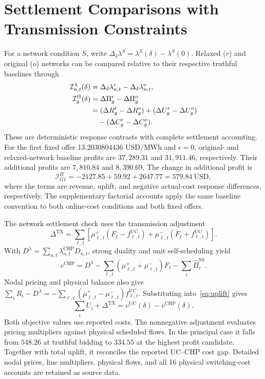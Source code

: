 \documentclass[journal]{IEEEtran}
\newcommand{\UC}{\mathrm{UC}}
\newcommand{\SSched}{\mathrm{SS}}
\newcommand{\CHP}{\mathrm{CHP}}
\begin{document}
\section{Settlement Comparisons with Transmission Constraints}\label{app:network-settlement}
For a network condition $S$, write $\Delta_\delta\lambda^S=\lambda^S(\delta)-\lambda^S(0)$. Relaxed ($r$) and original ($o$) networks can be compared relative to their respective truthful baselines through
\begin{align}
 \mathcal I_{n,t}^{\lambda}(\delta)&=\Delta_\delta\lambda_{n,t}^{r}-\Delta_\delta\lambda_{n,t}^{o},\label{eq:network-response}\\
 \mathcal I_g^{\Pi}(\delta)&=\Delta\Pi_g^{r}-\Delta\Pi_g^{o}\notag\\
 &= (\Delta R_g^{r}-\Delta R_g^{o})+(\Delta U_g^{r}-\Delta U_g^{o})\notag\\
 &\quad -(\Delta C_g^{r}-\Delta C_g^{o}).\label{eq:network-profit-response}
\end{align}
These are deterministic response contrasts with complete settlement accounting. For the first fixed offer 13.2030804436 USD/MWh and $\epsilon=0$, original- and relaxed-network baseline profits are $37{,}289.31$ and $31{,}911.46$, respectively. Their additional profits are $7{,}810.84$ and $8{,}390.69$. The change in additional profit is
\begin{equation}
 \mathcal I_{G1}^{\Pi}=-2127.85+59.92+2647.77=579.84\ \mathrm{USD},\label{eq:network-response-result}
\end{equation}
where the terms are revenue, uplift, and negative actual-cost response differences, respectively. The supplementary factorial accounts apply the same baseline convention to both online-cost conditions and both fixed offers.

The network settlement check uses the transmission adjustment
\begin{equation}
 \Delta^{\mathrm{TX}}=\sum_{\ell,t}
 [\mu_{\ell,t}^+(F_\ell-f_{\ell,t}^{\UC})
 +\mu_{\ell,t}^-(F_\ell+f_{\ell,t}^{\UC})].\label{eq:tx}
\end{equation}
With $D^{\lambda}=\sum_{n,t}\lambda_{n,t}^{\CHP}D_{n,t}$, strong duality and unit self-scheduling yield
\begin{equation}
 v^{\CHP}=D^{\lambda}-\sum_{\ell,t}(\mu_{\ell,t}^++\mu_{\ell,t}^-)F_\ell-\sum_i\widehat\Pi_i^{\SSched}.\label{eq:dual-bridge}
\end{equation}
Nodal pricing and physical balance also give $\sum_iR_i-D^{\lambda}=-\sum_{\ell,t}(\mu_{\ell,t}^+-\mu_{\ell,t}^-)f_{\ell,t}^{\UC}$. Substituting into~\eqref{eq:uplift} gives
\begin{equation}
 \sum_i U_i+\Delta^{\mathrm{TX}}=v^{\UC}(\delta)-v^{\CHP}(\delta).\label{eq:network-settlement}
\end{equation}
Both objective values use reported costs. The nonnegative adjustment evaluates pricing multipliers against physical scheduled flows. In the principal case it falls from $548.26$ at truthful bidding to $334.55$ at the highest profit candidate. Together with total uplift, it reconciles the reported UC--CHP cost gap. Detailed nodal prices, line multipliers, physical flows, and all 16 physical switching-cost accounts are retained as source data.
\end{document}

